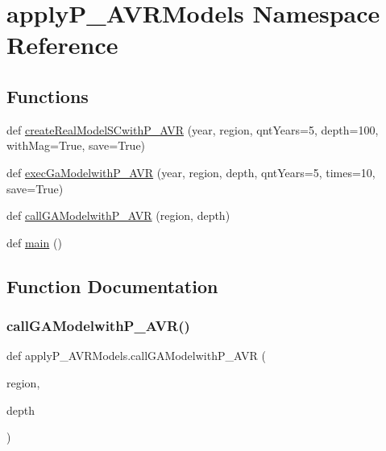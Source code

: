 \hypertarget{namespaceapply_p___a_v_r_models}{}\section{apply\+P\+\_\+\+A\+V\+R\+Models Namespace Reference}
\label{namespaceapply_p___a_v_r_models}
\subsection*{Functions}
\begin{DoxyCompactItemize}
\item 
def \hyperlink{namespaceapply_p___a_v_r_models_a8ab2650b13f6aff7578147d46be67e9e}{create\+Real\+Model\+S\+Cwith\+P\+\_\+\+A\+VR} (year, region, qnt\+Years=5, depth=100, with\+Mag=True, save=True)
\item 
def \hyperlink{namespaceapply_p___a_v_r_models_a2f8057e000fffd5887fcd28e6134c930}{exec\+Ga\+Modelwith\+P\+\_\+\+A\+VR} (year, region, depth, qnt\+Years=5, times=10, save=True)
\item 
def \hyperlink{namespaceapply_p___a_v_r_models_abea528ffd266df7794444b4e426d42fa}{call\+G\+A\+Modelwith\+P\+\_\+\+A\+VR} (region, depth)
\item 
def \hyperlink{namespaceapply_p___a_v_r_models_a964b6bb528b6482b871d880d9f8e9231}{main} ()
\end{DoxyCompactItemize}


\subsection{Function Documentation}
\mbox{\label{namespaceapply_p___a_v_r_models_abea528ffd266df7794444b4e426d42fa}} 
\subsubsection{\texorpdfstring{call\+G\+A\+Modelwith\+P\+\_\+\+A\+V\+R()}{callGAModelwithP\_AVR()}}
{\footnotesize\ttfamily def apply\+P\+\_\+\+A\+V\+R\+Models.\+call\+G\+A\+Modelwith\+P\+\_\+\+A\+VR (\begin{DoxyParamCaption}\item[{}]{region,  }\item[{}]{depth }\end{DoxyParamCaption})}

